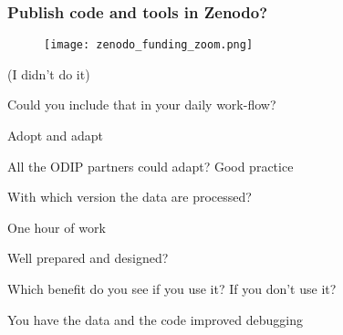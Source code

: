 \begin{frame}
\frametitle{Publish code and tools in Zenodo?}

\begin{figure}
\texttt{[image: zenodo\_funding\_zoom.png]}
\end{figure}

(I didn't do it)
\end{frame}

Could you include that in your daily work-flow?

Adopt and adapt

All the ODIP partners could adapt? 
Good practice

With which version the data are processed?

One hour of work 

Well prepared and designed?

Which benefit do you see if you use it?
If you don't use it?


You have the data and the code
improved debugging



